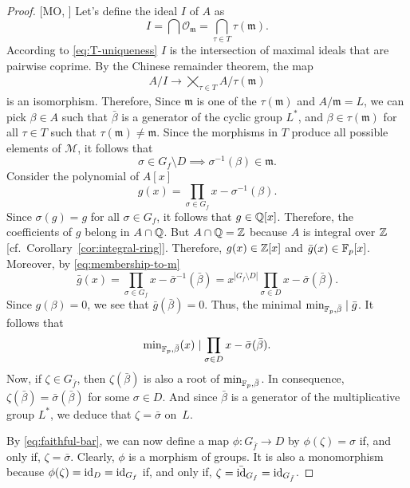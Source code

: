 \begin{proof} {[MO, \citeauthor{386280}]}
    Let's define the ideal $I$ of $A$ as
    $$
        I
            = \bigcap\mathcal O_{\mathfrak m}
            = \bigcap_{\tau\in T}\tau(\mathfrak m).
    $$
    According to \eqref{eq:T-uniqueness} $I$ is the intersection of maximal ideals that are pairwise coprime. By the Chinese remainder theorem, the map
    \begin{align*}
        A/I \to \bigtimes_{\tau\in T}A/\tau(\mathfrak m)
    \end{align*}
    is an isomorphism. Therefore, Since $\mathfrak m$ is one of the $\tau(\mathfrak m)$ and $A/\mathfrak m=L$, we can pick $\beta\in A$ such that $\bar\beta$ is a generator of the cyclic group $L^*$, and $\beta\in\tau(\mathfrak m)$ for all $\tau\in T$ such that $\tau(\mathfrak m)\ne\mathfrak m$. Since the morphisms in $T$ produce all possible elements of $\mathcal M$, it follows that
    \begin{equation}\label{eq:membership-to-m}
        \sigma\in G_f\setminus D
            \implies\sigma^{-1}(\beta)\in\mathfrak m.
    \end{equation}
    Consider the polynomial of $A[x]$
    $$
        g(x) = \prod_{\sigma\in G_f}x-\sigma^{-1}(\beta).
    $$
    Since $\sigma(g)=g$ for all $\sigma\in G_f$, it follows that $g\in\mathbb{Q}[x]$. Therefore, the coefficients of $g$ belong in $A\cap\mathbb{Q}$. But $A\cap\mathbb{Q}=\mathbb{Z}$ because $A$ is integral over $\mathbb{Z}$ [cf.~Corollary~\ref{cor:integral-ring}]. Therefore, $g(x)\in\mathbb{Z}[x]$ and $\bar g(x)\in\mathbb F_p[x]$. Moreover, by \eqref{eq:membership-to-m}
    $$
        \bar g(x)
        = \prod_{\sigma\in G_f}
            x-\bar\sigma^{-1}(\bar\beta)
        = x^{|G_f\setminus D|}
            \prod_{\sigma\in D}x-\bar\sigma(\bar\beta).
    $$    
    Since $g(\beta)=0$, we see that $\bar g(\bar\beta)=0$. Thus, the minimal $\operatorname{min}_{\mathbb F_p,\bar\beta}\mid\bar g$. It follows that
    $$
        \operatorname{min}_{\mathbb F_p,\bar\beta}(x)
        \mid \prod_{\sigma\in D}x-\bar\sigma(\bar\beta).
    $$
    Now, if $\zeta\in G_{\bar f}$, then $\zeta(\bar\beta)$ is also a root of $\operatorname{min}_{\mathbb F_p,\bar\beta}$. In consequence, $\zeta(\bar\beta)=\bar\sigma(\bar\beta)$ for some $\sigma\in D$. And since $\bar\beta$ is a generator of the multiplicative group $L^*$, we deduce that $\zeta=\bar\sigma$ on~$L$.
    
    By \eqref{eq:faithful-bar}, we can now define a map $\phi\colon G_{\bar f}\to D$ by $\phi(\zeta)=\sigma$ if, and only if, $\zeta=\bar\sigma$. Clearly, $\phi$ is a morphism of groups. It is also a monomorphism because $\phi(\zeta)=\operatorname{id}_D=\operatorname{id}_{G_f}$ if, and only if, $\zeta=\bar{\operatorname{id}}_{G_f}=\operatorname{id}_{G_{\bar f}}$.
\end{proof}

